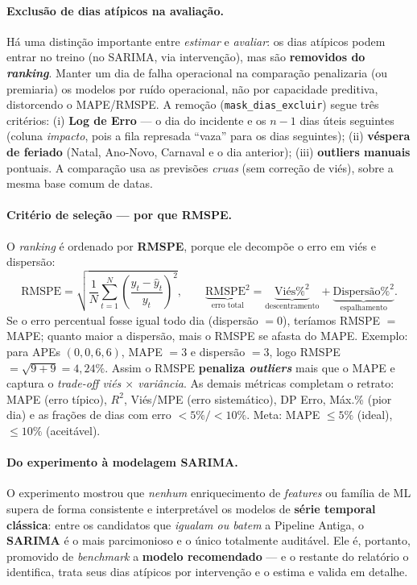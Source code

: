 \documentclass[11pt,a4paper]{article}
\begin{document}
\paragraph{Exclusão de dias atípicos na avaliação.}
\label{sec:excluir}
Há uma distinção importante entre \emph{estimar} e \emph{avaliar}: os dias atípicos podem entrar no
treino (no SARIMA, via intervenção), mas são \textbf{removidos do \emph{ranking}}. Manter um dia de
falha operacional na comparação penalizaria (ou premiaria) os modelos por ruído operacional, não
por capacidade preditiva, distorcendo o MAPE/RMSPE. A remoção (\texttt{mask\_dias\_excluir}) segue
três critérios: (i) \textbf{Log de Erro} --- o dia do incidente e os $n-1$ dias úteis seguintes
(coluna \emph{impacto}, pois a fila represada ``vaza'' para os dias seguintes); (ii) \textbf{véspera
de feriado} (Natal, Ano-Novo, Carnaval e o dia anterior); (iii) \textbf{outliers manuais}
pontuais. A comparação usa as previsões \emph{cruas} (sem correção de viés), sobre a mesma base
comum de datas.

\paragraph{Critério de seleção --- por que RMSPE.} O \emph{ranking} é ordenado por \textbf{RMSPE},
porque ele decompõe o erro em viés e dispersão:
\begin{equation}
\text{RMSPE} = \sqrt{\frac{1}{N}\sum_{t=1}^{N}\!\left(\frac{y_t-\hat y_t}{y_t}\right)^{\!2}},
\qquad
\underbrace{\text{RMSPE}^2}_{\text{erro total}} = \underbrace{\text{Viés}\%^2}_{\text{descentramento}} + \underbrace{\text{Dispersão}\%^2}_{\text{espalhamento}}.
\label{eq:rmspe}
\end{equation}
Se o erro percentual fosse igual todo dia (dispersão $=0$), teríamos RMSPE $=$ MAPE; quanto maior a
dispersão, mais o RMSPE se afasta do MAPE. Exemplo: para APEs $(0,0,6,6)$, MAPE $=3$ e dispersão
$=3$, logo RMSPE $=\sqrt{9+9}=4{,}24\%$. Assim o RMSPE \textbf{penaliza \emph{outliers}} mais que o
MAPE e captura o \emph{trade-off viés $\times$ variância}. As demais métricas completam o retrato:
MAPE (erro típico), $R^2$, Viés/MPE (erro sistemático), DP Erro, Máx.\% (pior dia) e as frações de
dias com erro $<5\%/<10\%$. Meta: MAPE $\le 5\%$ (ideal), $\le 10\%$ (aceitável).

\paragraph{Do experimento à modelagem SARIMA.} O experimento mostrou que \emph{nenhum} enriquecimento
de \emph{features} ou família de ML supera de forma consistente e interpretável os modelos de
\textbf{série temporal clássica}: entre os candidatos que \emph{igualam ou batem} a Pipeline
Antiga, o \textbf{SARIMA} é o mais parcimonioso e o único totalmente auditável. Ele é, portanto,
promovido de \emph{benchmark} a \textbf{modelo recomendado} --- e o restante do relatório o
identifica, trata seus dias atípicos por intervenção e o estima e valida em detalhe.
\end{document}
